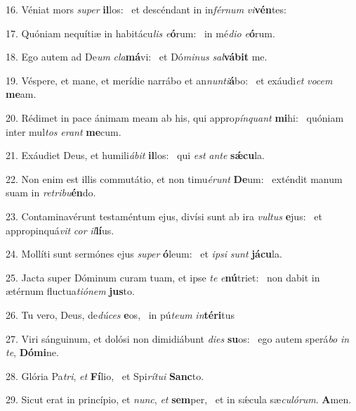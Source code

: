 16. Véniat mors \textit{su}\textit{per} \textbf{il}los: \ast\  et descéndant in in\textit{fér}\textit{num} \textit{vi}\textbf{vén}tes:\

17. Quóniam nequítiæ in habitácu\textit{lis} \textit{e}\textbf{ó}rum: \ast\  in mé\textit{di}\textit{o} \textit{e}\textbf{ó}rum.\

18. Ego autem ad De\textit{um} \textit{cla}\textbf{má}vi: \ast\  et Dó\textit{mi}\textit{nus} \textit{sal}\textbf{vá}\textbf{bit} me.\

19. Véspere, et mane, et merídie narrábo et an\textit{nun}\textit{ti}\textbf{á}bo: \ast\  et exáudi\textit{et} \textit{vo}\textit{cem} \textbf{me}am.\

20. Rédimet in pace ánimam meam ab his, qui appro\textit{pín}\textit{quant} \textbf{mi}hi: \ast\  quóniam inter mul\textit{tos} \textit{e}\textit{rant} \textbf{me}cum.\

21. Exáudiet Deus, et humili\textit{á}\textit{bit} \textbf{il}los: \ast\  qui \textit{est} \textit{an}\textit{te} \textbf{sǽ}\textbf{cu}la.\

22. Non enim est illis commutátio, et non timu\textit{é}\textit{runt} \textbf{De}um: \ast\  exténdit manum suam in \textit{re}\textit{tri}\textit{bu}\textbf{én}do.\

23. Contaminavérunt testaméntum ejus, divísi sunt ab ira \textit{vul}\textit{tus} \textbf{e}jus: \ast\  et appropinquá\textit{vit} \textit{cor} \textit{il}\textbf{lí}us.\

24. Mollíti sunt sermónes ejus \textit{su}\textit{per} \textbf{ó}leum: \ast\  et \textit{ip}\textit{si} \textit{sunt} \textbf{já}\textbf{cu}la.\

25. Jacta super Dóminum curam tuam, et ipse \textit{te} \textit{e}\textbf{nú}triet: \ast\  non dabit in ætérnum fluctua\textit{ti}\textit{ó}\textit{nem} \textbf{jus}to.\

26. Tu vero, Deus, de\textit{dú}\textit{ces} \textbf{e}os, \ast\  in pú\textit{te}\textit{um} \textit{in}\textbf{tér}\textbf{i}tus\

27. Viri sánguinum, et dolósi non dimidiábunt \textit{di}\textit{es} \textbf{su}os: \ast\  ego autem sperá\textit{bo} \textit{in} \textit{te}, \textbf{Dó}\textbf{mi}ne.\

28. Glória Pa\textit{tri}, \textit{et} \textbf{Fí}lio, \ast\  et Spi\textit{rí}\textit{tu}\textit{i} \textbf{Sanc}to.\

29. Sicut erat in princípio, et \textit{nunc}, \textit{et} \textbf{sem}per, \ast\  et in sǽcula sæ\textit{cu}\textit{ló}\textit{rum}. \textbf{A}men.\

